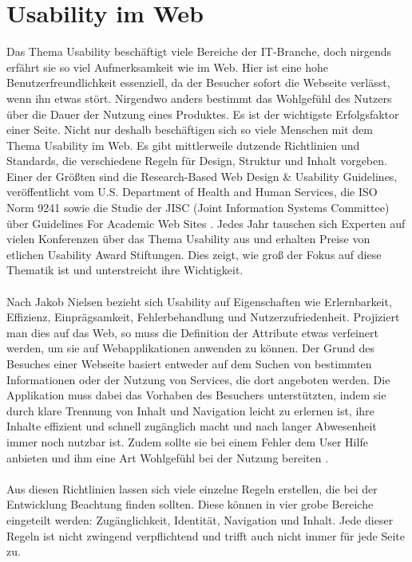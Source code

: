 %
%
%
%


\section{Usability im Web}
Das Thema Usability beschäftigt viele Bereiche der IT-Branche, doch nirgends erfährt sie so viel Aufmerksamkeit wie im Web. Hier ist eine hohe Benutzerfreundlichkeit essenziell, da der Besucher sofort die Webseite verlässt, wenn ihn etwas stört. Nirgendwo anders bestimmt das Wohlgefühl des Nutzers über die Dauer der Nutzung eines Produktes. Es ist der wichtigste Erfolgsfaktor einer Seite. Nicht nur deshalb beschäftigen sich so viele Menschen mit dem Thema Usability im Web. Es gibt mittlerweile dutzende Richtlinien und Standards, die verschiedene Regeln für Design, Struktur und Inhalt vorgeben. Einer der Größten sind die \glqq Research-Based Web  Design \& Usability Guidelines\grqq{}, veröffentlicht vom U.S. Department of Health and Human Services, die ISO Norm 9241 sowie die Studie der JISC (Joint Information Systems Committee) über \glqq Guidelines For Academic Web Sites\grqq{} \cite{isoStandards}. Jedes Jahr tauschen sich Experten auf vielen Konferenzen über das Thema Usability aus und erhalten Preise von etlichen Usability Award Stiftungen. Dies zeigt, wie groß der Fokus auf diese Thematik ist und unterstreicht ihre Wichtigkeit.\\
\\
Nach Jakob Nielsen bezieht sich Usability auf Eigenschaften wie Erlernbarkeit, Effizienz, Einprägsamkeit, Fehlerbehandlung und Nutzerzufriedenheit. Projiziert man dies auf das Web, so muss die Definition der Attribute etwas verfeinert werden, um sie auf Webapplikationen anwenden zu können. Der Grund des Besuches einer Webseite basiert entweder auf dem Suchen von bestimmten Informationen oder der Nutzung von Services, die dort angeboten werden. Die Applikation muss dabei das Vorhaben des Besuchers unterstützten, indem sie durch klare Trennung von Inhalt und Navigation leicht zu erlernen ist, ihre Inhalte effizient und schnell zugänglich macht und nach langer Abwesenheit immer noch nutzbar ist. Zudem sollte sie bei einem Fehler dem User Hilfe anbieten und ihm eine Art Wohlgefühl bei der Nutzung bereiten \cite{UsabilityPriciples}.\\
\\
Aus diesen Richtlinien lassen sich viele einzelne Regeln erstellen, die bei der Entwicklung Beachtung finden sollten. Diese können in vier grobe Bereiche eingeteilt werden: Zugänglichkeit, Identität, Navigation und Inhalt. Jede dieser Regeln ist nicht zwingend verpflichtend und trifft auch nicht immer für jede Seite zu.


